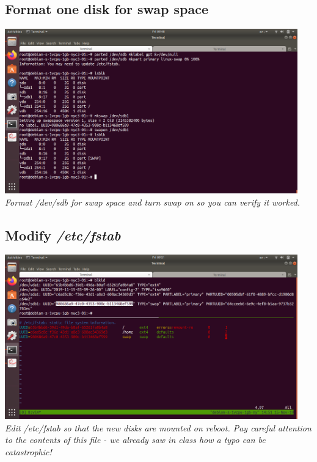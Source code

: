 \documentclass[10pt]{article}
\begin{document}
\subsection{Format one disk for swap space}
\begin{center}
    \includegraphics[width=0.95\textwidth]{Images/05_formattedForSwap.png}
	\textit{Format /dev/sdb for swap space and turn swap on so you can verify it
worked.}
\end{center}

\subsection{Modify \textit{/etc/fstab}}
\begin{center}
    \includegraphics[width=0.95\textwidth]{Images/06_fstab.png}
	\textit{Edit /etc/fstab so that the new disks are mounted on reboot. Pay
careful attention to the contents of this file - we already saw in class how a
typo can be catastrophic!}
\end{center}
\end{document}
